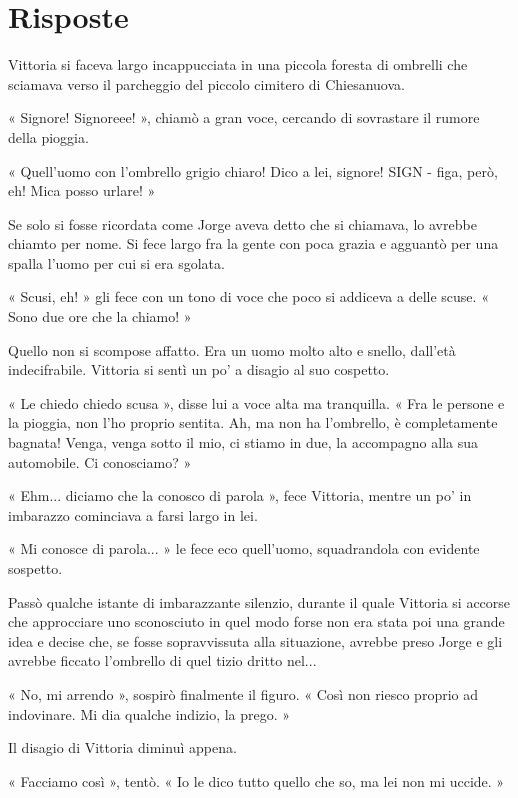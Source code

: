 \chapter{Risposte}


Vittoria si faceva largo incappucciata in una piccola foresta di ombrelli che sciamava verso il parcheggio del piccolo cimitero di Chiesanuova.

« Signore! Signoreee! », chiamò a gran voce, cercando di sovrastare il rumore della pioggia.

« Quell'uomo con l'ombrello grigio chiaro! Dico a lei, signore! SIGN - figa, però, eh! Mica posso urlare! »

Se solo si fosse ricordata come Jorge aveva detto che si chiamava, lo avrebbe chiamto per nome. Si fece largo fra la gente con poca grazia e agguantò per una spalla l'uomo per cui si era sgolata.

« Scusi, eh! » gli fece con un tono di voce che poco si addiceva a delle scuse. « Sono due ore che la chiamo! »

Quello non si scompose affatto. Era un uomo molto alto e snello, dall'età indecifrabile. Vittoria si sentì un po' a disagio al suo cospetto.

« Le chiedo chiedo scusa », disse lui a voce alta ma tranquilla. « Fra le persone e la pioggia, non l'ho proprio sentita. Ah, ma non ha l'ombrello, è completamente bagnata! Venga, venga sotto il mio, ci stiamo in due, la accompagno alla sua automobile. Ci conosciamo? »

« Ehm... diciamo che la conosco di parola », fece Vittoria, mentre un po' in imbarazzo cominciava a farsi largo in lei.

« Mi conosce di parola... » le fece eco quell'uomo, squadrandola con evidente sospetto.

Passò qualche istante di imbarazzante silenzio, durante il quale Vittoria si accorse che approcciare uno sconosciuto in quel modo forse non era stata poi una grande idea e decise che, se fosse sopravvissuta alla situazione, avrebbe preso Jorge e gli avrebbe ficcato l'ombrello di quel tizio dritto nel...

« No, mi arrendo », sospirò finalmente il figuro. « Così non riesco proprio ad indovinare. Mi dia qualche indizio, la prego. »

Il disagio di Vittoria diminuì appena.

« Facciamo così », tentò. « Io le dico tutto quello che so, ma lei non mi uccide. »

